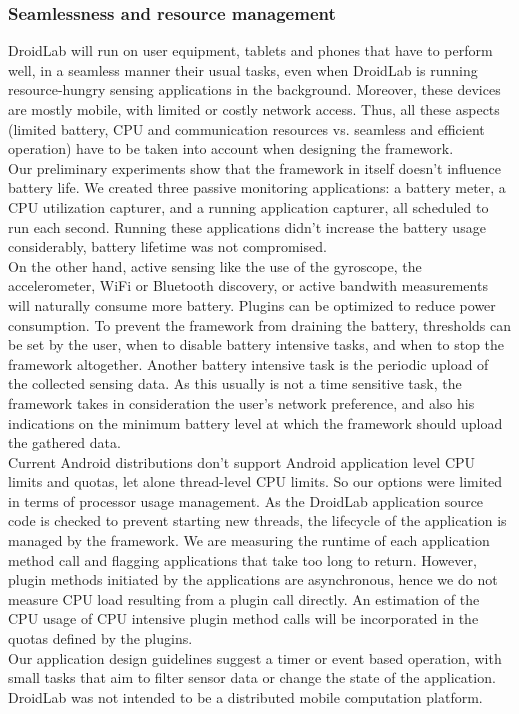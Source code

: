 \documentclass[conference,letterpaper]{IEEEtran}
\begin{document}
\subsubsection{Seamlessness and resource management}
DroidLab will run on user equipment, tablets and phones that have to perform well, in a seamless manner their usual tasks, even when DroidLab is running resource-hungry sensing applications in the background. Moreover, these devices are mostly mobile, with limited or costly network access. Thus, all these aspects (limited battery, CPU and communication resources vs. seamless and efficient operation) have to be taken into account when designing the framework. \\
\indent Our preliminary experiments show that the framework in itself doesn't influence battery life. We created three passive monitoring applications: a battery meter, a CPU utilization capturer, and a running application capturer, all scheduled to run each second. Running these applications didn't increase the battery usage considerably, battery lifetime was not compromised.\\
\indent On the other hand, active sensing like the use of the gyroscope, the accelerometer, WiFi or Bluetooth discovery, or active bandwith measurements will naturally consume more battery. Plugins can be optimized to reduce power consumption. To prevent the framework from draining the battery, thresholds can be set by the user, when to disable battery intensive tasks, and when to stop the framework altogether.
Another battery intensive task is the periodic upload of the collected sensing data. As this usually is not a time sensitive task, the framework takes in consideration the user's network preference, and also his indications on the minimum battery level at which the framework should upload the gathered data.\\
\indent Current Android distributions don't support Android application level CPU limits and quotas, let alone thread-level CPU limits. So our options were limited in terms of processor usage management. As the DroidLab application source code is checked to prevent starting new threads, the lifecycle of the application is managed by the framework. We are measuring the runtime of each application method call and flagging applications that take too long to return. However, plugin methods initiated by the applications are asynchronous, hence we do not measure CPU load resulting from a plugin call directly. An estimation of the CPU usage of CPU intensive plugin method calls will be incorporated in the quotas defined by the plugins.\\
\indent Our application design guidelines suggest a timer or event based operation, with small tasks that aim to filter sensor data or change the state of the application. DroidLab was not intended to be a distributed mobile computation platform.
\end{document}
